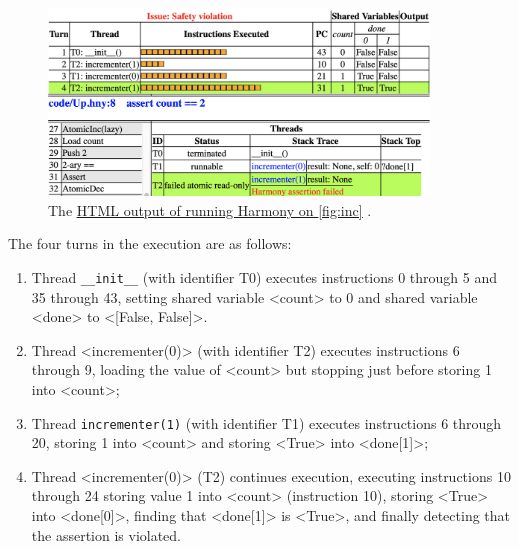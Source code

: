 \documentclass{report}
\newcommand{\harmonyref}[2]{%
\href{https://harmony.cs.cornell.edu/output/#1}{\underline{#2}}%
}
\begin{document}
\begin{figure}
\begin{center}
\includegraphics[width=0.9\textwidth]{figures/Up1.png}
\end{center}
\caption{The
\harmonyref{Up.html}{HTML output of running Harmony on \autoref{fig:inc}}.
}
\label{fig:inchtml1}
\end{figure}

The four turns in the execution are as follows:

\begin{enumerate}
\item Thread \texttt{\_\_init\_\_} (with identifier T0)
executes instructions 0 through 5 and 35 through 43, setting
shared variable <{count}> to 0 and
shared variable <{done}> to <{[False, False]}>.
\item Thread <{incrementer(0)}> (with identifier T2)
executes instructions 6 through 9, loading the value of
<{count}> but stopping just before storing 1 into <{count}>;
\item Thread \texttt{incrementer(1)} (with identifier T1)
executes instructions 6 through 20, storing 1 into
<{count}> and storing <{True}> into <{done[1]}>;
\item Thread <{incrementer(0)}> (T2)
continues execution, executing instructions 10 through 24
storing value 1 into <{count}> (instruction 10),
storing <{True}> into <{done[0]}>,
finding that <{done[1]}> is <{True}>,
and finally detecting that the assertion is violated.
\end{enumerate}
\end{document}
